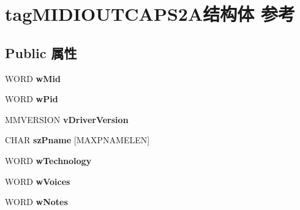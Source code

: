 \hypertarget{structtag_m_i_d_i_o_u_t_c_a_p_s2_a}{}\section{tag\+M\+I\+D\+I\+O\+U\+T\+C\+A\+P\+S2\+A结构体 参考}
\label{structtag_m_i_d_i_o_u_t_c_a_p_s2_a}
\subsection*{Public 属性}
\begin{DoxyCompactItemize}
\item 
\mbox{\label{structtag_m_i_d_i_o_u_t_c_a_p_s2_a_a5cb01a9afcfd54748b5d04b5939f043a}} 
W\+O\+RD {\bfseries w\+Mid}
\item 
\mbox{\label{structtag_m_i_d_i_o_u_t_c_a_p_s2_a_ae4d5f39ae5044cfed917145c61d31b37}} 
W\+O\+RD {\bfseries w\+Pid}
\item 
\mbox{\label{structtag_m_i_d_i_o_u_t_c_a_p_s2_a_a01483753e21d90c789896e1ff5ed194e}} 
M\+M\+V\+E\+R\+S\+I\+ON {\bfseries v\+Driver\+Version}
\item 
\mbox{\label{structtag_m_i_d_i_o_u_t_c_a_p_s2_a_a5a230b48f1c1c5fbef60343641223ed1}} 
C\+H\+AR {\bfseries sz\+Pname} \mbox{[}M\+A\+X\+P\+N\+A\+M\+E\+L\+EN\mbox{]}
\item 
\mbox{\label{structtag_m_i_d_i_o_u_t_c_a_p_s2_a_a30290e01a2a75b5f44fedec4e56a3131}} 
W\+O\+RD {\bfseries w\+Technology}
\item 
\mbox{\label{structtag_m_i_d_i_o_u_t_c_a_p_s2_a_a69a0ce0c00fc9a21fa995f531347e122}} 
W\+O\+RD {\bfseries w\+Voices}
\item 
\mbox{\label{structtag_m_i_d_i_o_u_t_c_a_p_s2_a_a5862f907fa95775ff3938960bca94bbf}} 
W\+O\+RD {\bfseries w\+Notes}
\item 
\mbox{\label{structtag_m_i_d_i_o_u_t_c_a_p_s2_a_ad5f2f1f61728f5038855987a6140d00d}} 

\end{DoxyCompactItemize}
